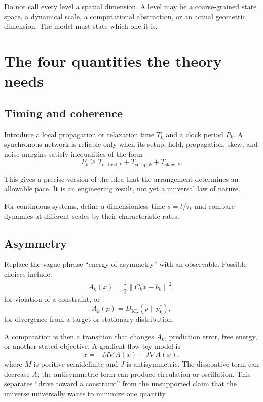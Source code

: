 \documentclass[11pt]{article}
\newcommand{\KL}{D_{\mathrm{KL}}}
\newcommand{\norm}[1]{\left\lVert #1 \right\rVert}
\theoremstyle{definition}
\theoremstyle{plain}
\theoremstyle{remark}
\begin{document}
Do not call every level a spatial dimension. A level may be a coarse-grained state space, a dynamical scale, a computational abstraction, or an actual geometric dimension. The model must state which one it is.

\section{The four quantities the theory needs}

\subsection{Timing and coherence}

Introduce a local propagation or relaxation time $T_k$ and a clock period $P_k$. A synchronous network is reliable only when its setup, hold, propagation, skew, and noise margins satisfy inequalities of the form
\begin{equation}
  P_k\geq T_{\mathrm{critical},k}+T_{\mathrm{setup},k}+T_{\mathrm{skew},k}.
  \label{eq:timing}
\end{equation}

This gives a precise version of the idea that the arrangement determines an allowable pace. It is an engineering result, not yet a universal law of nature.

For continuous systems, define a dimensionless time $s=t/\tau_k$ and compare dynamics at different scales by their characteristic rates.

\subsection{Asymmetry}

Replace the vague phrase ``energy of asymmetry'' with an observable. Possible choices include:
\begin{equation}
  A_k(x)=\frac12\norm{C_kx-b_k}^2,
  \label{eq:constraint-asymmetry}
\end{equation}
for violation of a constraint, or
\begin{equation}
  A_k(p)=\KL(p\mathbin\|p_k^\ast),
  \label{eq:distribution-asymmetry}
\end{equation}
for divergence from a target or stationary distribution.

A computation is then a transition that changes $A_k$, prediction error, free energy, or another stated objective. A gradient-flow toy model is
\begin{equation}
  \dot{x}=-M\nabla A(x)+J\nabla A(x),
  \label{eq:gradient-flow}
\end{equation}
where $M$ is positive semidefinite and $J$ is antisymmetric. The dissipative term can decrease $A$; the antisymmetric term can produce circulation or oscillation. This separates ``drive toward a constraint'' from the unsupported claim that the universe universally wants to minimize one quantity.
\end{document}
